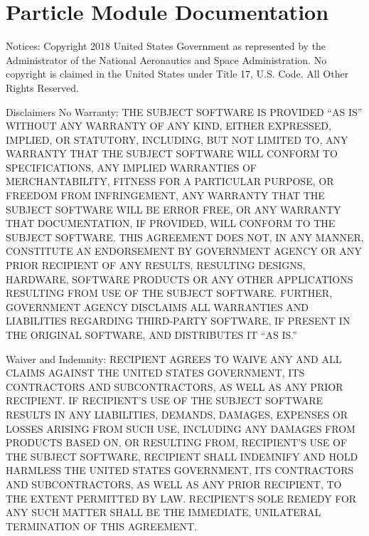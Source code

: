 \documentclass[letterpaper,10pt,english]{sphinxmanual}
\begin{document}
\section{Particle Module Documentation}
\label{\detokenize{source_code:module-smcpy.particles.particle}}\label{\detokenize{source_code:particle-module-documentation}}
Notices:
Copyright 2018 United States Government as represented by the Administrator of
the National Aeronautics and Space Administration. No copyright is claimed in
the United States under Title 17, U.S. Code. All Other Rights Reserved.

Disclaimers
No Warranty: THE SUBJECT SOFTWARE IS PROVIDED “AS IS” WITHOUT ANY WARRANTY OF
ANY KIND, EITHER EXPRESSED, IMPLIED, OR STATUTORY, INCLUDING, BUT NOT LIMITED
TO, ANY WARRANTY THAT THE SUBJECT SOFTWARE WILL CONFORM TO SPECIFICATIONS, ANY
IMPLIED WARRANTIES OF MERCHANTABILITY, FITNESS FOR A PARTICULAR PURPOSE, OR
FREEDOM FROM INFRINGEMENT, ANY WARRANTY THAT THE SUBJECT SOFTWARE WILL BE ERROR
FREE, OR ANY WARRANTY THAT DOCUMENTATION, IF PROVIDED, WILL CONFORM TO THE
SUBJECT SOFTWARE. THIS AGREEMENT DOES NOT, IN ANY MANNER, CONSTITUTE AN
ENDORSEMENT BY GOVERNMENT AGENCY OR ANY PRIOR RECIPIENT OF ANY RESULTS,
RESULTING DESIGNS, HARDWARE, SOFTWARE PRODUCTS OR ANY OTHER APPLICATIONS
RESULTING FROM USE OF THE SUBJECT SOFTWARE.  FURTHER, GOVERNMENT AGENCY
DISCLAIMS ALL WARRANTIES AND LIABILITIES REGARDING THIRD-PARTY SOFTWARE, IF
PRESENT IN THE ORIGINAL SOFTWARE, AND DISTRIBUTES IT “AS IS.”

Waiver and Indemnity:  RECIPIENT AGREES TO WAIVE ANY AND ALL CLAIMS AGAINST THE
UNITED STATES GOVERNMENT, ITS CONTRACTORS AND SUBCONTRACTORS, AS WELL AS ANY
PRIOR RECIPIENT.  IF RECIPIENT’S USE OF THE SUBJECT SOFTWARE RESULTS IN ANY
LIABILITIES, DEMANDS, DAMAGES, EXPENSES OR LOSSES ARISING FROM SUCH USE,
INCLUDING ANY DAMAGES FROM PRODUCTS BASED ON, OR RESULTING FROM, RECIPIENT’S
USE OF THE SUBJECT SOFTWARE, RECIPIENT SHALL INDEMNIFY AND HOLD HARMLESS THE
UNITED STATES GOVERNMENT, ITS CONTRACTORS AND SUBCONTRACTORS, AS WELL AS ANY
PRIOR RECIPIENT, TO THE EXTENT PERMITTED BY LAW.  RECIPIENT’S SOLE REMEDY FOR
ANY SUCH MATTER SHALL BE THE IMMEDIATE, UNILATERAL TERMINATION OF THIS
AGREEMENT.
\end{document}
